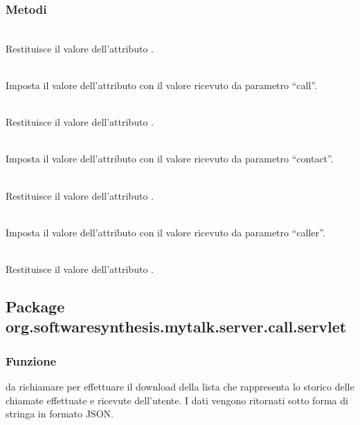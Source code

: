 \subsubsection*{Metodi}
\begin{description}
	\item{}\\
	Restituisce il valore dell'attributo .
	
	\item{}\\
	Imposta il valore dell'attributo  con il valore ricevuto da parametro ``call''.
	\item{}\\
	Restituisce il valore dell'attributo .
	
	\item{}\\
	Imposta il valore dell'attributo  con il valore ricevuto da parametro ``contact''.
	\item{}\\
	Restituisce il valore dell'attributo .
	
	\item{}\\
	Imposta il valore dell'attributo  con il valore ricevuto da parametro ``caller''.
	\item{}\\
	Restituisce il valore dell'attributo .
\end{description}

\subsection{Package org.softwaresynthesis.mytalk.server.call.servlet}\label{sec:callServlet}


\subsubsection*{Funzione}
 da richiamare per effettuare il download della lista che rappresenta lo storico delle chiamate effettuate e ricevute dell'utente. I dati vengono ritornati sotto forma di stringa in formato JSON.

